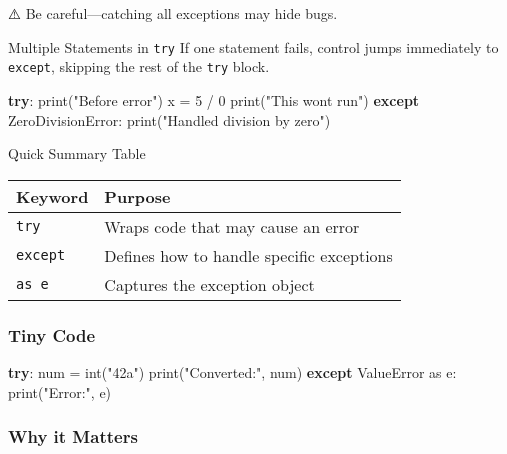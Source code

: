 \documentclass[
  letterpaper,
  DIV=11,
  numbers=noendperiod]{scrreprt}
\newenvironment{Shaded}{\begin{snugshade}}{\end{snugshade}}
\newcommand{\BuiltInTok}[1]{\textcolor[rgb]{0.00,0.23,0.31}{#1}}
\newcommand{\ControlFlowTok}[1]{\textcolor[rgb]{0.00,0.23,0.31}{\textbf{#1}}}
\newcommand{\DecValTok}[1]{\textcolor[rgb]{0.68,0.00,0.00}{#1}}
\newcommand{\ImportTok}[1]{\textcolor[rgb]{0.00,0.46,0.62}{#1}}
\newcommand{\NormalTok}[1]{\textcolor[rgb]{0.00,0.23,0.31}{#1}}
\newcommand{\OperatorTok}[1]{\textcolor[rgb]{0.37,0.37,0.37}{#1}}
\newcommand{\PreprocessorTok}[1]{\textcolor[rgb]{0.68,0.00,0.00}{#1}}
\newcommand{\StringTok}[1]{\textcolor[rgb]{0.13,0.47,0.30}{#1}}
\begin{document}
⚠️ Be careful---catching all exceptions may hide bugs.

Multiple Statements in \texttt{try} If one statement fails, control
jumps immediately to \texttt{except}, skipping the rest of the
\texttt{try} block.

\begin{Shaded}
\begin{Highlighting}[]
\ControlFlowTok{try}\NormalTok{:}
    \BuiltInTok{print}\NormalTok{(}\StringTok{"Before error"}\NormalTok{)}
\NormalTok{    x }\OperatorTok{=} \DecValTok{5} \OperatorTok{/} \DecValTok{0}
    \BuiltInTok{print}\NormalTok{(}\StringTok{"This won\textquotesingle{}t run"}\NormalTok{)}
\ControlFlowTok{except} \PreprocessorTok{ZeroDivisionError}\NormalTok{:}
    \BuiltInTok{print}\NormalTok{(}\StringTok{"Handled division by zero"}\NormalTok{)}
\end{Highlighting}
\end{Shaded}

Quick Summary Table

\begin{longtable}[]{@{}ll@{}}
\toprule\noalign{}
Keyword & Purpose \\
\midrule\noalign{}
\endhead
\bottomrule\noalign{}
\endlastfoot
\texttt{try} & Wraps code that may cause an error \\
\texttt{except} & Defines how to handle specific exceptions \\
\texttt{as\ e} & Captures the exception object \\
\end{longtable}

\subsubsection{Tiny Code}\label{tiny-code-72}

\begin{Shaded}
\begin{Highlighting}[]
\ControlFlowTok{try}\NormalTok{:}
\NormalTok{    num }\OperatorTok{=} \BuiltInTok{int}\NormalTok{(}\StringTok{"42a"}\NormalTok{)}
    \BuiltInTok{print}\NormalTok{(}\StringTok{"Converted:"}\NormalTok{, num)}
\ControlFlowTok{except} \PreprocessorTok{ValueError} \ImportTok{as}\NormalTok{ e:}
    \BuiltInTok{print}\NormalTok{(}\StringTok{"Error:"}\NormalTok{, e)}
\end{Highlighting}
\end{Shaded}

\subsubsection{Why it Matters}\label{why-it-matters-72}
\end{document}
